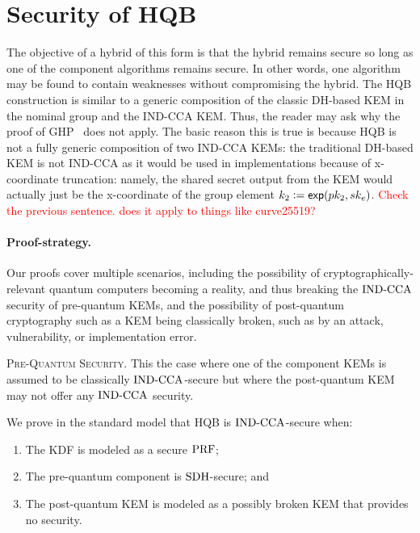 \section{Security of HQB}\label{sec:hqb-proofs}

The objective of a hybrid of this form is that the hybrid remains secure so
long as one of the component algorithms remains secure. In other words, one
algorithm may be found to contain weaknesses without compromising the hybrid.
\newcommand{\defineequals}{\vcentcolon=}
The HQB construction is similar to a generic composition of the classic DH-based KEM in the nominal group and the IND-CCA KEM. Thus, the reader may ask why the proof of GHP~\cite{...} does not apply. The basic reason this is true is because HQB is not a fully generic composition of two IND-CCA KEMs: the traditional DH-based KEM is not IND-CCA as it would be used in implementations because of x-coordinate truncation: namely, the shared secret output from the KEM would actually just be the x-coordinate of the group element $k_2 \defineequals \nexp(\pk_2, \sk_e)$. \textcolor{red}{Check the previous sentence. does it apply to things like curve25519?}

\paragraph{Proof-strategy.}

Our proofs cover multiple scenarios, including the possibility of
cryptographically-relevant quantum computers becoming a reality, and thus
breaking the $\text{IND-CCA}$ security of pre-quantum KEMs, and the possibility of
post-quantum cryptography such as a KEM being classically broken, such as by
an attack, vulnerability, or implementation error.

\medskip \noindent
\textsc{Pre-Quantum Security.} This the case where one of the component
KEMs is assumed to be classically $\text{IND-CCA}$-secure but where the post-quantum
KEM may not offer any $\text{IND-CCA}$ security.

We prove in the standard model that HQB is $\text{IND-CCA}$-secure when:
\begin{enumerate}
\item The KDF is modeled as a secure $\text{PRF}$;
\item The pre-quantum component is $\text{SDH}$-secure; and
\item The post-quantum KEM is modeled as a possibly broken KEM that provides no security.
\end{enumerate}

